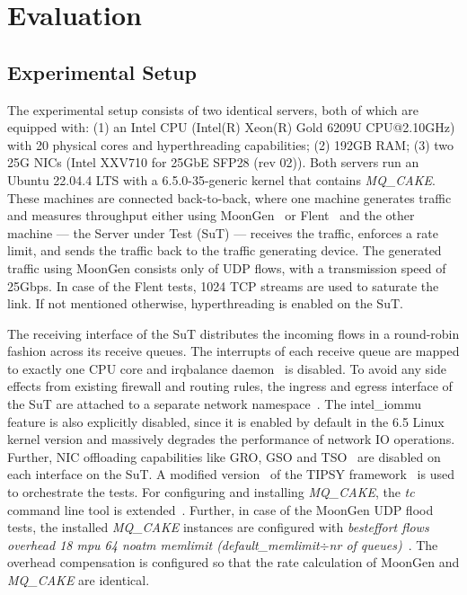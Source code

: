 \section{Evaluation}\label{sec:evaluation}
\subsection{Experimental Setup}
The experimental setup consists of two identical servers, both of which are equipped with: 
(1) an Intel CPU (Intel(R) Xeon(R) Gold 6209U CPU@2.10GHz) with 20 physical cores and hyperthreading capabilities;
(2) 192GB RAM;
(3) two 25G NICs (Intel XXV710 for 25GbE SFP28 (rev 02)).
Both servers run an Ubuntu 22.04.4 LTS with a 6.5.0-35-generic kernel that contains \textit{MQ\_CAKE}. 
These machines are connected back-to-back, where one machine generates traffic and measures throughput either using MoonGen~\cite{moongen} or Flent~\cite{flent} and the other machine --- the Server under Test (SuT) --- receives the traffic, enforces a rate limit, and sends the traffic back to the traffic generating device.
%
The generated traffic using MoonGen consists only of UDP flows, with a transmission speed of 25Gbps.
%
In case of the Flent tests, 1024 TCP streams are used to saturate the link.
%
If not mentioned otherwise, hyperthreading is enabled on the SuT.

The receiving interface of the SuT distributes the incoming flows in a round-robin fashion across its receive queues.
%
The interrupts of each receive queue are mapped to exactly one CPU core and irqbalance daemon~\cite{irqbalance} is disabled.
%
To avoid any side effects from existing firewall and routing rules, the ingress and egress interface of the SuT are attached to a separate network namespace~\cite{network-namespace}.
%
The intel\_iommu~\cite{iommu} feature is also explicitly disabled, since it is enabled by default in the 6.5 Linux kernel version and massively degrades the performance of network IO operations.
%
Further, NIC offloading capabilities like GRO, GSO and TSO~\cite{offloads} are disabled on each interface on the SuT.
%
A modified version~\cite{my-modified-tipsy} of the TIPSY framework~\cite{tipsy} is used to orchestrate the tests.
%
For configuring and installing \textit{MQ\_CAKE}, the \textit{tc} command line tool is extended~\cite{my-iproute}.
%
Further, in case of the MoonGen UDP flood tests, the installed \textit{MQ\_CAKE} instances are configured with \textit{besteffort flows overhead 18 mpu 64 noatm memlimit (default\_memlimit$\div$nr of queues)}~\cite{cake-manual}.
%
The overhead compensation is configured so that the rate calculation of MoonGen and \textit{MQ\_CAKE} are identical.
%

